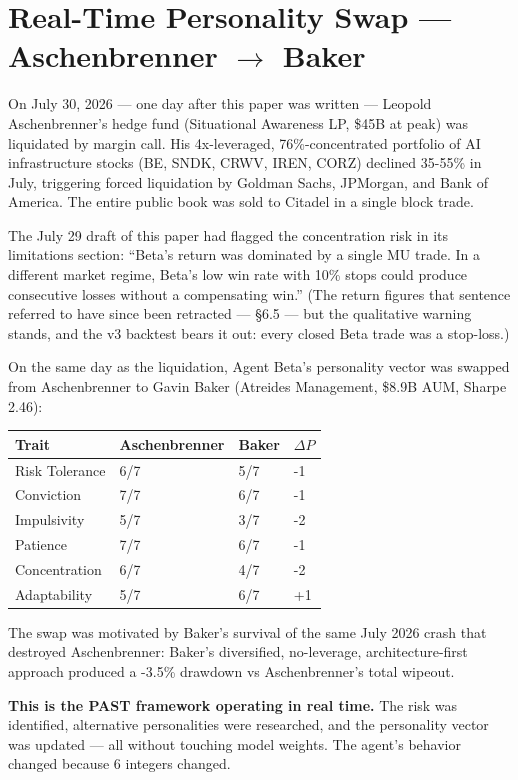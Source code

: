 \documentclass[11pt]{article}
\begin{document}
\appendix
\section{Real-Time Personality Swap --- Aschenbrenner $\rightarrow$ Baker}
On July 30, 2026 --- one day after this paper was written --- Leopold Aschenbrenner's hedge fund (Situational Awareness LP, \$45B at peak) was liquidated by margin call. His 4x-leveraged, 76\%-concentrated portfolio of AI infrastructure stocks (BE, SNDK, CRWV, IREN, CORZ) declined 35-55\% in July, triggering forced liquidation by Goldman Sachs, JPMorgan, and Bank of America. The entire public book was sold to Citadel in a single block trade.

The July 29 draft of this paper had flagged the concentration risk in its limitations section: ``Beta's return was dominated by a single MU trade. In a different market regime, Beta's low win rate with 10\% stops could produce consecutive losses without a compensating win.'' (The return figures that sentence referred to have since been retracted --- §6.5 --- but the qualitative warning stands, and the v3 backtest bears it out: every closed Beta trade was a stop-loss.)

On the same day as the liquidation, Agent Beta's personality vector was swapped from Aschenbrenner to Gavin Baker (Atreides Management, \$8.9B AUM, Sharpe 2.46):

{\def\LTcaptype{none} %
{\small
\begin{longtable}{@{}llll@{}}
\toprule\noalign{}
Trait & Aschenbrenner & Baker & \(\Delta P\) \\
\midrule\noalign{}
\endhead
\bottomrule\noalign{}
\endlastfoot
\renewcommand{\arraystretch}{1.15}
Risk Tolerance & 6/7 & 5/7 & -1 \\
Conviction & 7/7 & 6/7 & -1 \\
Impulsivity & 5/7 & 3/7 & -2 \\
Patience & 7/7 & 6/7 & -1 \\
Concentration & 6/7 & 4/7 & -2 \\
Adaptability & 5/7 & 6/7 & +1 \\
\end{longtable}}
}

The swap was motivated by Baker's survival of the same July 2026 crash that destroyed Aschenbrenner: Baker's diversified, no-leverage, architecture-first approach produced a -3.5\% drawdown vs Aschenbrenner's total wipeout.

\textbf{This is the PAST framework operating in real time.} The risk was identified, alternative personalities were researched, and the personality vector was updated --- all without touching model weights. The agent's behavior changed because 6 integers changed.
\end{document}
